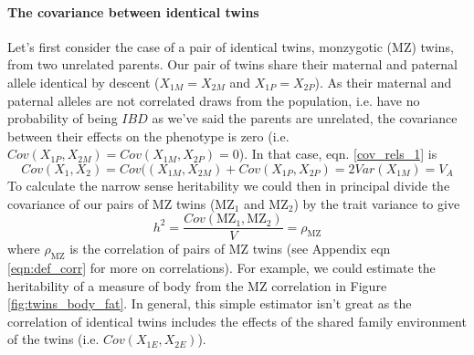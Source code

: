 \paragraph{The covariance between identical twins}
Let's first consider the case of a pair of identical twins, monzygotic
(MZ) twins, from two
unrelated parents. Our pair of twins share their maternal and paternal
allele identical by descent ($X_{1M}=X_{2M}$ and $X_{1P}=X_{2P}$). As their maternal and
paternal alleles are not correlated draws from the population,
i.e. have no probability of being $IBD$ as we've said the parents are unrelated, the
covariance between their effects on the phenotype is zero  
(i.e. $Cov(X_{1P},X_{2M})=Cov(X_{1M},X_{2P})=0$). In that case,
eqn. \ref{cov_rels_1} is
\begin{equation}
Cov(X_1,X_2) = Cov((X_{1M},X_{2M})+Cov(X_{1P},X_{2P}) = 2Var(X_{1M})
= V_A
\end{equation}
To calculate the narrow sense heritability we could then in principal divide the
covariance of our pairs of MZ  twins (MZ$_1$ and MZ$_2$) by the trait variance to give
\begin{equation}
h^2 = \frac{Cov(\text{MZ}_1, \text{MZ}_2) }{V} =
\rho_{\text{MZ}}
\end{equation}
where $\rho_{\text{MZ}}$ is the correlation of pairs of MZ twins (see
Appendix eqn \eqref{eqn:def_corr} for more on correlations).
For example, we could estimate the heritability of a measure of body
from the MZ correlation in Figure \ref{fig:twins_body_fat}. In general, this simple estimator isn't great as the correlation of
identical twins includes the effects of the shared family
environment of the twins (i.e. $Cov(X_{1E},X_{2E})$).
